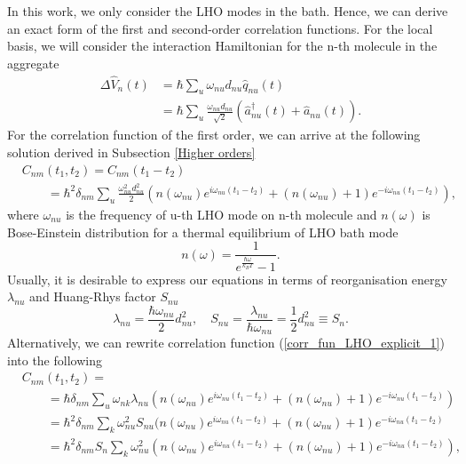 In this work, we only consider the LHO modes in the bath. Hence, we can derive an exact form of the first and second-order correlation functions. For the local basis, we will consider the interaction Hamiltonian for the n-th molecule in the aggregate
\begin{equation}
    \begin{aligned}
        \Delta \hat{V}_n(t) &= \hbar \sum_{u} \omega_{nu}d_{nu}\hat{q}_{nu}(t) \\
        &= \hbar \sum_{u} \frac{\omega_{nu}d_{nu}}{\sqrt{2}}(\hat{a}_{nu}^\dagger(t) + \hat{a}_{nu}(t)).
    \end{aligned}
\end{equation}
For the correlation function of the first order, we can arrive at the following solution derived in Subsection \ref{Higher orders}
\begin{equation}
\label{corr_fun_LHO_explicit_1}
    \begin{aligned}
        &C_{nm}(t_1, t_2) = C_{nm}(t_1-t_2) \\
        &\quad \quad = \hbar^2 \delta_{nm} \sum_{u} \frac{\omega_{nu}^2 d_{nu}^2}{2} (n(\omega_{nu})e^{i\omega_{nu}(t_1-t_2)} + (n(\omega_{nu})+1)e^{-i\omega_{nu}(t_1-t_2)}),
    \end{aligned}
\end{equation}
where $\omega_{nu}$ is the frequency of u-th LHO mode on n-th molecule and $n(\omega)$ is Bose-Einstein distribution for a thermal equilibrium of LHO bath mode
\begin{equation}
    n(\omega) = \frac{1}{e^{\frac{\hbar\omega}{k_B T}} - 1}.
\end{equation}
Usually, it is desirable to express our equations in terms of reorganisation energy $\lambda_{nu}$ and Huang-Rhys factor $S_{nu}$ 
\begin{equation}
    \lambda_{nu} = \frac{\hbar\omega_{nu}}{2}d_{nu}^2, \quad S_{nu} = \frac{\lambda_{nu}}{\hbar \omega_{nu}} = \frac{1}{2} d_{nu}^2 \equiv S_n.
\end{equation}
Alternatively, we can rewrite correlation function (\ref{corr_fun_LHO_explicit_1}) into the following 
\begin{equation}
\label{corr_fun_LHO_explicit_2}
    \begin{aligned}
        &C_{nm}(t_1, t_2) =  \\
        &\quad \quad = \hbar \delta_{nm} \sum_{u} \omega_{nk}\lambda_{nu} (n(\omega_{nu})e^{i\omega_{nu}(t_1-t_2)} + (n(\omega_{nu})+1)e^{-i\omega_{nu}(t_1-t_2)}) \\
        &\quad \quad = \hbar^2 \delta_{nm} \sum_{k} \omega_{nu}^2S_{nu}(n(\omega_{nu})e^{i\omega_{nu}(t_1-t_2)} + (n(\omega_{nu})+1)e^{-i\omega_{nu}(t_1-t_2)} \\
        &\quad \quad = \hbar^2 \delta_{nm} S_{n} \sum_{k} \omega_{nu}^2(n(\omega_{nu})e^{i\omega_{nu}(t_1-t_2)} + (n(\omega_{nu})+1)e^{-i\omega_{nu}(t_1-t_2)}),
    \end{aligned}
\end{equation}
